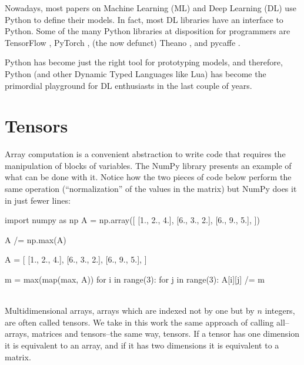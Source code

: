 Nowadays, most papers on Machine Learning (ML) and Deep Learning (DL)
use Python to define their models. In fact, most DL libraries have an
interface to Python. Some of the many Python libraries at disposition
for programmers are TensorFlow \autocite{abadi_tensorflow_2016},
PyTorch \autocite{paszke2017pytorch}, (the now defunct) Theano
\autocite{bergstra2011theano}, and pycaffe \autocite[as part of the
Caffe framework]{jia2014caffe}.

Python has become just the right tool for prototyping models, and therefore, Python (and
other Dynamic Typed Languages like Lua) has become the primordial playground for DL
enthusiasts in the last couple of years.

\section{Tensors}\label{tensors}

Array computation is a convenient abstraction to write code that requires the manipulation
of blocks of variables. The NumPy library presents an example of what can be done with it.
Notice how the two pieces of code below perform the same operation
(\enquote{normalization} of the values in the matrix) but NumPy does it in just fewer
lines:

\noindent%
\begin{minipage}[t]{.48\textwidth}
\begin{pythoncode}
import numpy as np
A = np.array([
  [1., 2., 4.],
  [6., 3., 2.],
  [6., 9., 5.],
])

A /= np.max(A)
\end{pythoncode}
\end{minipage}%
\hfill%
\begin{minipage}[t]{.48\textwidth}
\begin{pythoncode}
A = [
  [1., 2., 4.],
  [6., 3., 2.],
  [6., 9., 5.],
]

m = max(map(max, A))
for i in range(3):
  for j in range(3):
    A[i][j] /= m
\end{pythoncode}
\end{minipage}\\[.7em]

Multidimensional arrays, arrays which are indexed not by one but by $n$ integers, are
often called tensors. We take in this work the same approach of calling all--arrays,
matrices and tensors--the same way, tensors. If a tensor has one dimension it is
equivalent to an array, and if it has two dimensions it is equivalent to a matrix.

